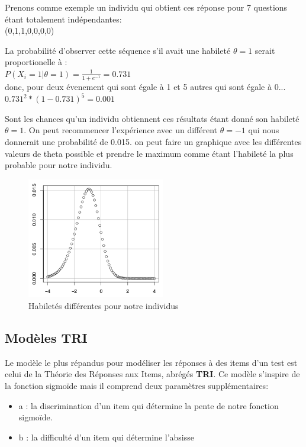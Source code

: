 \documentclass[oneside]{book}
\begin{document}
Prenons comme exemple un individu qui obtient ces réponse pour 7 questions étant totalement indépendantes:\\

\centering
(0,1,1,0,0,0,0)
\justify

La probabilité d'observer cette séquence s'il avait une habileté $\theta = 1$ serait proportionelle à :\\

\centering
$P(X_i = 1| \theta = 1) = \frac{1}{1 + e^{-1}} = 0.731$\\

donc, pour deux évenement qui sont égale à 1 et 5 autres qui sont égale à 0...\\

$0.731^2 * (1 - 0.731)^5 = 0.001$\\
\justify

Sont les chances qu'un individu obtiennent ces résultats étant donné son habileté $\theta = 1$. On peut recommencer l'expérience avec un différent $\theta = -1$ qui nous donnerait une probabilité de 0.015. on peut faire un graphique avec les différentes valeurs de theta possible et prendre le maximum comme étant l'habileté la plus probable pour notre individu.\\

\begin{figure}[!ht]
\centering
\includegraphics[width = 6cm]{graph_theta.png}
\caption{Habiletés différentes pour notre individus}
\label{fig:graph_theta}
\end{figure} 

\subsection{Modèles TRI}
Le modèle le plus répandus pour modéliser les réponses à des items d'un test est celui de la Théorie des Réponses aux Items, abrégés \textbf{TRI}. Ce modèle s'inspire de la fonction sigmoïde mais il comprend deux paramètres supplémentaires:
\begin{itemize}
\item a : la discrimination d'un item qui détermine la pente de notre fonction sigmoïde.
\item b : la difficulté d'un item qui détermine l'absisse
\end{itemize}
\end{document}
